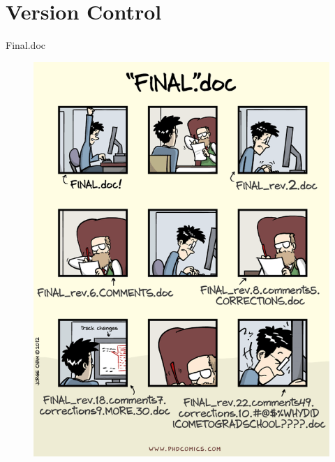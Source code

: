 \documentclass[10pt,times]{beamer}
\begin{document}
\section{Version Control}
\begin{frame}{Final.doc}
\begin{figure}
\includegraphics[height=0.8\textheight]{figs/final.png}
\end{figure}
\end{frame}
\end{document}
